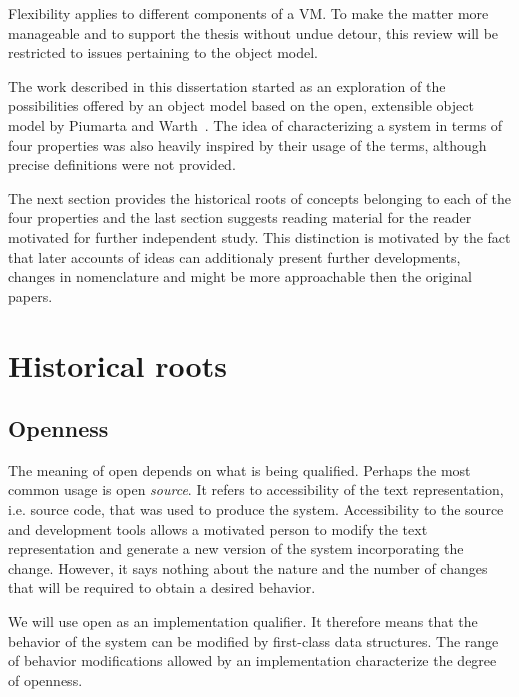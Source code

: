 Flexibility applies to different components of a VM. To make the matter more
manageable and to support the thesis without undue detour, this review will be
restricted to issues pertaining to the object model. 

The work described in this dissertation started as an exploration of the
possibilities offered by an object model based on the open, extensible object
model by Piumarta and Warth~\cite{Piumarta:2008}. The idea of characterizing a
system in terms of four properties was also heavily inspired by their usage of
the terms, although precise definitions were not provided.

The next section provides the historical roots of concepts belonging to each of
the four properties and the last section suggests reading material for the
reader motivated for further independent study. This distinction is motivated
by the fact that later accounts of ideas can additionaly present further
developments, changes in nomenclature and might be more approachable then the
original papers.

\section{Historical roots}

\subsection{Openness}

The meaning of open depends on what is being qualified. Perhaps the most common
usage is open \textit{source}. It refers to accessibility of the text
representation, i.e. source code, that was used to produce the system.
Accessibility to the source and development tools allows a motivated person to
modify the text representation and generate a new version of the system
incorporating the change. However, it says nothing about the nature and the
number of changes that will be required to obtain a desired behavior.

We will use open as an implementation qualifier. It therefore means that
the behavior of the system can be modified by first-class data structures. The
range of behavior modifications allowed by an implementation characterize the
degree of openness.

